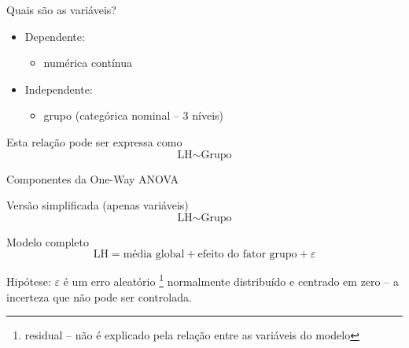 \documentclass{beamer}
\begin{document}
\begin{frame}{\scriptsize Quais são as variáveis?}
  \begin{itemize}
    \footnotesize
  \item Dependente:
    \begin{itemize}
      \scriptsize
    \item numérica contínua
    \end{itemize}
  \item Independente:
    \begin{itemize}
      \scriptsize
    \item grupo (categórica nominal -- 3 níveis)
    \end{itemize}
  \end{itemize}
  \vfill
  \begin{block}{Esta relação pode ser expressa como}
    \begin{displaymath}
      \text{LH} \sim \text{Grupo}
    \end{displaymath}
  \end{block}
\end{frame}

\begin{frame}{\scriptsize Componentes da One-Way ANOVA}
  \begin{block}{\footnotesize Versão simplificada (apenas variáveis)}
    \footnotesize
    \begin{displaymath}
      \text{LH} \sim \text{Grupo}
    \end{displaymath}
  \end{block}
  \bigskip
  \bigskip
  \begin{block}{Modelo completo}
    \begin{displaymath}
      \text{LH} = \text{média global} + \text{efeito do fator grupo} + \varepsilon
    \end{displaymath}
  \end{block}
  \vfill
  \footnotesize
  Hipótese: $\varepsilon$ é um erro aleatório \footnote{\scriptsize residual -- não é explicado pela relação entre as variáveis do modelo} normalmente distribuído e centrado em zero -- a incerteza que não pode ser controlada.
\end{frame}
\end{document}
